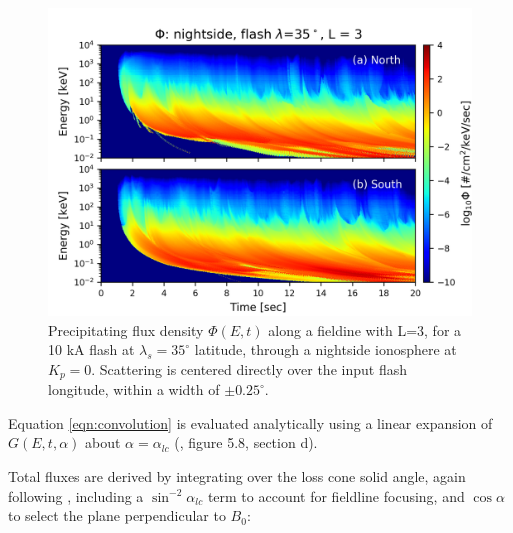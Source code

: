 \begin{figure}[ht]
\begin{center}
\includegraphics{figures/phi_E-t_spectra.png}
\caption[Precipitating flux density E-t spectra for $\lambda_s=35^\circ$ and L=3]{Precipitating flux density $\Phi(E,t)$ along a fieldine with L=3, for a 10 kA flash at $\lambda_s=35^\circ$ latitude, through a nightside ionosphere at $K_p=0$. Scattering is centered directly over the input flash longitude, within a width of $\pm0.25^\circ.$}
\label{fig:phi_E-t_spectra}
\end{center}
\end{figure}

Equation \eqref{eqn:convolution} is evaluated analytically using a linear expansion of $G(E,t,\alpha)$ about $\alpha = \alpha_{lc}$ (\cite{Bortnik2005}, figure 5.8, section d).

%
%
Total fluxes are derived by integrating over the loss cone solid angle, again following \cite{Bortnik2005}, including a $\sin^{-2}\alpha_{lc}$ term to account for fieldline focusing, and $\cos\alpha$ to select the plane perpendicular to $B_0$:

